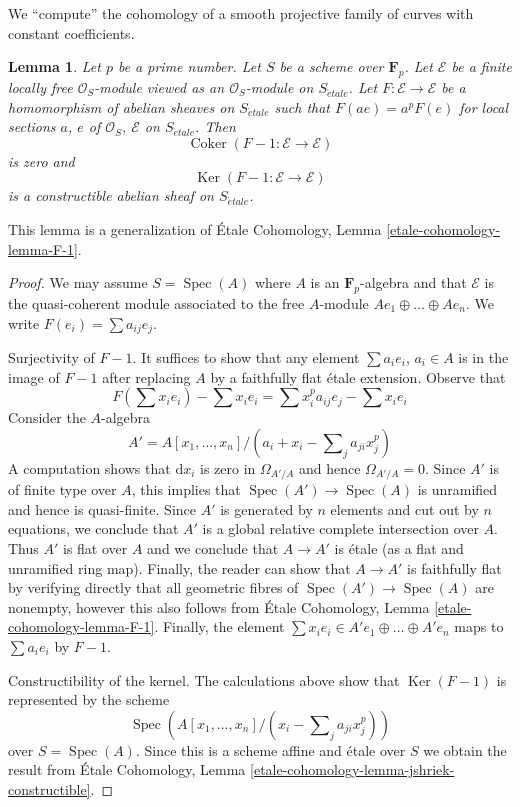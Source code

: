 \documentclass{stacks-project}
\theoremstyle{plain}
\newtheorem{lemma}[subsection]{Lemma}
\theoremstyle{definition}
\theoremstyle{remark}
\numberwithin{equation}{subsection}
\def\Spec{\mathop{\mathrm{Spec}}}
\def\etale{{\acute{e}tale}}
\def\Ker{\mathop{\mathrm{Ker}}}
\def\Coker{\mathop{\mathrm{Coker}}}
\begin{document}
\noindent
We ``compute'' the cohomology of a smooth projective
family of curves with constant coefficients.

\begin{lemma}
\label{lemma-frobenius-linear-on-vb}
Let $p$ be a prime number. Let $S$ be a scheme over $\mathbf{F}_p$.
Let $\mathcal{E}$ be a finite locally free
$\mathcal{O}_S$-module viewed as an $\mathcal{O}_S$-module on $S_\etale$.
Let $F : \mathcal{E} \to \mathcal{E}$ be a homomorphism of abelian sheaves
on $S_\etale$ such that $F(a e) = a^pF(e)$ for local sections $a$, $e$
of $\mathcal{O}_S$, $\mathcal{E}$ on $S_\etale$. Then
$$
\Coker(F - 1 : \mathcal{E} \to \mathcal{E})
$$
is zero and
$$
\Ker(F - 1 : \mathcal{E} \to \mathcal{E})
$$
is a constructible abelian sheaf on $S_\etale$.
\end{lemma}

\noindent
This lemma is a generalization of \'Etale Cohomology, Lemma
\ref{etale-cohomology-lemma-F-1}.

\begin{proof}
We may assume $S = \Spec(A)$ where $A$ is an $\mathbf{F}_p$-algebra
and that $\mathcal{E}$ is the quasi-coherent module associated
to the free $A$-module $Ae_1 \oplus \ldots \oplus Ae_n$.
We write $F(e_i) = \sum a_{ij} e_j$.

\medskip\noindent
Surjectivity of $F - 1$. It suffices to show that any element
$\sum a_i e_i$, $a_i \in A$ is in the image of $F - 1$
after replacing $A$ by a faithfully flat \'etale extension.
Observe that
$$
F(\sum x_ie_i) - \sum x_i e_i = \sum x_i^p a_{ij} e_j - \sum x_i e_i
$$
Consider the $A$-algebra
$$
A' = A[x_1, \ldots, x_n]/(a_i + x_i - \sum\nolimits_j a_{ji} x_j^p)
$$
A computation shows that $\text{d}x_i$ is zero in $\Omega_{A'/A}$
and hence $\Omega_{A'/A} = 0$. Since $A'$ is of finite type over
$A$, this implies that $\Spec(A') \to \Spec(A)$ is unramified
and hence is quasi-finite. Since $A'$ is generated by $n$ elements
and cut out by $n$ equations, we conclude that $A'$
is a global relative complete intersection over $A$.
Thus $A'$ is flat over $A$ and we conclude that $A \to A'$
is \'etale (as a flat and unramified ring map). Finally,
the reader can show that $A \to A'$ is faithfully flat
by verifying directly that all geometric fibres of
$\Spec(A') \to \Spec(A)$ are nonempty, however this also
follows from \'Etale Cohomology, Lemma
\ref{etale-cohomology-lemma-F-1}.
Finally, the element $\sum x_i e_i \in A'e_1 \oplus \ldots \oplus A'e_n$
maps to $\sum a_i e_i$ by $F - 1$.

\medskip\noindent
Constructibility of the kernel. The calculations above show that
$\Ker(F - 1)$ is represented by the scheme
$$
\Spec(A[x_1, \ldots, x_n]/(x_i - \sum\nolimits_j a_{ji} x_j^p))
$$
over $S = \Spec(A)$. Since this is a scheme affine and \'etale
over $S$ we obtain the result from
\'Etale Cohomology, Lemma \ref{etale-cohomology-lemma-jshriek-constructible}.
\end{proof}
\end{document}
